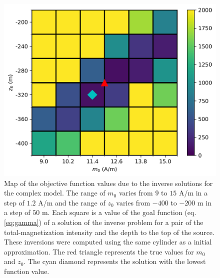 \begin{figure}
	\centering
	\includegraphics[scale=.75]{figures/complex_obj_func_map.png}
	\caption{Map of the objective function values due to the inverse solutions for the complex model. The range of $m_0$ varies from $9$ to $15$ A/m in a step of $1.2$ A/m and the range of $z_0$ varies from $-400$ to $-200$ m in a step of $50$ m. Each square is a value of the goal function (eq. \ref{eq:gamma}) of a solution of the inverse problem for a pair of the total-magnetization intensity and the depth to the top of the source. These inversions were computed using the same cylinder as a initial approximation. The red triangle represents the true values for $m_0$ and $z_0$. The cyan diamond represents the solution with the lowest function value.
	}
	\label{fig:complex_map}
\end{figure}

